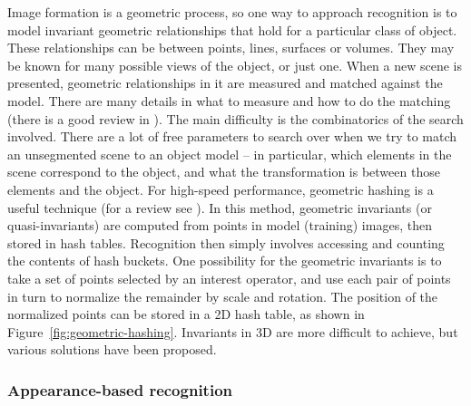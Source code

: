 Image formation is a geometric process, so one way to approach 
recognition is to model invariant geometric relationships that
hold for a particular class of object.  These relationships
can be between points, lines, surfaces or volumes.
%
They may be known for many possible views of the object, or just one.
When a new scene is presented, geometric relationships in it
are measured and matched against the model.
%
There are many details in what to measure and how to do the matching
(there is a good review in \cite{selinger01analysis}).
%
The main difficulty is the combinatorics of the search involved.
There are a lot of free parameters to search over when we try to
match an unsegmented scene to an object model -- in particular,
which elements in the scene correspond to the object, and 
what the transformation is between those elements and the object.
%
For high-speed performance, geometric hashing is a useful technique
(for a review see \cite{wolfson97geometric}).  In this method,
geometric invariants (or quasi-invariants) are computed from points in
model (training) images, then stored in hash tables.  Recognition then
simply involves accessing and counting the contents of hash buckets.
%
One possibility for the geometric invariants is to take a set of
points selected by an interest operator, and use each pair of points
in turn to normalize the remainder by scale and rotation.  The
position of the normalized points can be stored in a 2D hash table, as
shown in Figure~\ref{fig:geometric-hashing}.  Invariants in 3D are
more difficult to achieve, but various solutions have been proposed.

\subsubsection*{Appearance-based recognition}

